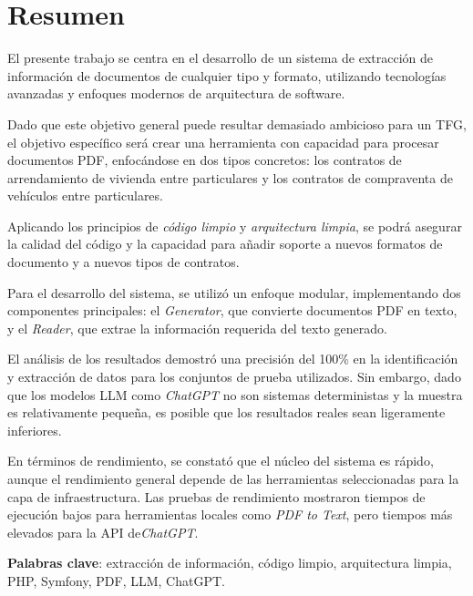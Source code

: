 \newpage
\section*{Resumen}

El presente trabajo se centra en el desarrollo de un sistema de extracción de información de documentos de cualquier
tipo y formato, utilizando tecnologías avanzadas y enfoques modernos de arquitectura de software.

Dado que este objetivo general puede resultar demasiado ambicioso para un TFG, el objetivo específico será crear una
herramienta con capacidad para procesar documentos PDF, enfocándose en dos tipos concretos: los contratos de
arrendamiento de vivienda entre particulares y los contratos de compraventa de vehículos entre particulares.

Aplicando los principios de \textit{código limpio} y \textit{arquitectura limpia}, se podrá asegurar la calidad del
código y la capacidad para añadir soporte a nuevos formatos de documento y a nuevos tipos de contratos.

Para el desarrollo del sistema, se utilizó un enfoque modular, implementando dos componentes principales: el
\textit{Generator}, que convierte documentos PDF en texto, y el \textit{Reader}, que extrae la información requerida
del texto generado.

El análisis de los resultados demostró una precisión del 100\% en la identificación y extracción de datos para los
conjuntos de prueba utilizados.
Sin embargo, dado que los modelos LLM como \textit{ChatGPT} no son sistemas deterministas y la muestra es relativamente
pequeña, es posible que los resultados reales sean ligeramente inferiores.

En términos de rendimiento, se constató que el núcleo del sistema es rápido, aunque el rendimiento general depende de
las herramientas seleccionadas para la capa de infraestructura.
Las pruebas de rendimiento mostraron tiempos de ejecución bajos para herramientas locales como \textit{PDF to Text}, pero
tiempos más elevados para la API de\textit{ChatGPT}.


\vspace{1cm}

\textbf{Palabras clave}: extracción de información, código limpio, arquitectura limpia, PHP, Symfony, PDF, LLM, ChatGPT.